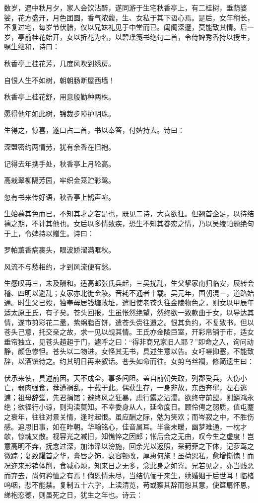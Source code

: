 \documentclass[a4paper,12pt,UTF8,twoside]{ctexbook}
\begin{document}
数岁，遇中秋月夕，家人会饮沾醉，遂同游于生宅秋香亭上，有二桂树，垂荫婆娑，花方盛开，月色团圆，香气浓馥，生、女私于其下语心焉。是后，女年稍长，不复过宅，每岁节伏腊，仅以兄妹礼见于中堂而已。闺阁深邃，莫能致其情。后一岁，亭前桂花始开，女以折花为名，以碧瑶笺书绝句二首，令侍婢秀香持以授生，嘱生继和，诗曰：

秋香亭上桂花芳，几度风吹到绣房。

自恨人生不如树，朝朝肠断屋西墙！

秋香亭上桂花舒，用意殷勤种两株。

愿得他年如此树，锦裁步障护明珠。

生得之，惊喜，遂口占二首，书以奉答，付婢持去。诗曰：

深盟密约两情劳，犹有余香在旧袍。

记得去年携手处，秋香亭上月轮高。

高栽翠柳隔芳园，牢织金笼贮彩鸳。

忽有书来传好语，秋香亭上鹊声喧。

生始慕其色而已，不知其才之若是也，既见二诗，大喜欲狂。但翘首企足，以待结褵之期，不计其他也。女后以多情致疾，恐生不知其眷恋之情，乃以吴绫帕题绝句于上，令婢持以赠生。诗曰：

罗帕薰香病裹头，眼波娇溜满眶秋。

风流不与愁相约，才到风流便有愁。

生感叹再三，未及酬和。适高邮张氏兵起，三吴扰乱，生父挈家南归临安，展转会稽、四明以避乱；女家亦北徙金陵。音耗不通者十载。吴元年，国朝混一，道路始通。时生父已殁，独奉母居钱塘故址，遣旧使老苍头往金陵物色之，则女以甲辰年适太原王氏，有子矣。苍头回报，生虽怅然绝望，然终欲一致款曲于女，以导达其情，遂市剪彩花二盝，紫绵脂百饼，遣苍头赍往遗之。恨其负约，不复致书，但以苍头己意，托交亲之故，求一见以觇其情。王氏亦金陵巨室，开彩帛铺于市，适女垂帘独立，见苍头趦趄于门，遽呼之曰：“得非商兄家旧人耶？”即命之入，询问动静，颜色惨怛。苍头以二物进，女怪其无书，具述生意以告。女吁嗟抑塞，不能致辞，以酒馔待之。约其明日再来叙话。苍头如命而往。女剪乌丝襴，修简遗生曰：

伏承来使，具述前因。天不成全，事多间阻。盖自前朝失政，列郡受兵，大伤小亡，弱肉强食，荐遭祸乱，十载于此。偶获生存，一身非故，东西奔窜，左右逃逋；祖母辞堂，先君捐馆；避终风之狂暴，虑行露之沾濡。欲终守前盟，则鳞鸿永绝；欲径行小谅，则沟渎莫知。不幸委身从人，延命度日。顾伶俜之弱质，值屯蹇之衰年，往往对景关情，逢时起恨。虽应酬之际，勉为笑欢；而岑寂之中，不胜伤感。追思旧事，如在昨朝。华翰铭心，佳音属耳。半衾未暖，幽梦难通，一枕才欹，惊魂又散。视容光之减旧，知憔悴之因郎；怅后会之无由，叹今生之虚度！岂意高明不弃，抚念过深，加沛泽以滂施，回余光以返照，采葑菲之下体，记萝茑之微踪；复致耀首之华，膏唇之饰，衰容顿改，厚惠何施！虽荷恩私，愈增惭愧！而况迩来形销体削，食减心烦，知来日之无多，念此身之如寄。兄若见之，亦当贱恶而弃去，尚何矜恤之有焉！倘恩情未尽，当结伉俪于来生，续婚姻于后世耳！临楮呜咽，悲不能禁。复制五十六字，上渎清览，苟或察其辞而恕其意，使箧扇怀恩，绨袍恋德，则虽死之日，犹生之年也。诗云：
\end{document}
